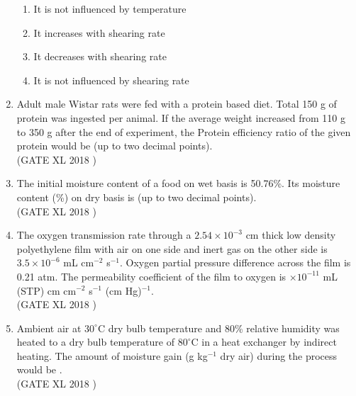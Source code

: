 \documentclass[14pt]{extarticle}
\begin{document}
\begin{flushleft}
\begin{enumerate}
\begin{enumerate}[label=(\Alph*)]
    \item It is not influenced by temperature
    \item It increases with shearing rate
    \item It decreases with shearing rate
    \item It is not influenced by shearing rate
\end{enumerate}

\item Adult male Wistar rats were fed with a protein based diet. Total 150 g of protein was ingested per animal. If the average weight increased from 110 g to 350 g after the end of experiment, the Protein efficiency ratio of the given protein would be \underline{\hspace{2cm}} (up to two decimal points).\\
\hfill(GATE XL 2018 )\\


\item The initial moisture content of a food on wet basis is 50.76\%. Its moisture content (\%) on dry basis is \underline{\hspace{2cm}} (up to two decimal points).\\
\hfill(GATE XL 2018 )\\

\item The oxygen transmission rate through a $2.54\times 10^{-3}$ cm thick low density polyethylene film with air on one side and inert gas on the other side is $3.5\times 10^{-6}$ mL cm$^{-2}$ s$^{-1}$. Oxygen partial pressure difference across the film is 0.21 atm. The permeability coefficient of the film to oxygen is \underline{\hspace{2cm}} $\times 10^{-11}$ mL (STP) cm cm$^{-2}$ s$^{-1}$ (cm Hg)$^{-1}$.\\
\hfill(GATE XL 2018 )\\

\item Ambient air at $30^\circ$C dry bulb temperature and 80\% relative humidity was heated to a dry bulb temperature of $80^\circ$C in a heat exchanger by indirect heating. The amount of moisture gain (g kg$^{-1}$ dry air) during the process would be \underline{\hspace{2cm}}.\\
\hfill(GATE XL 2018 )\\


\end{enumerate}
\end{flushleft}
\end{document}
